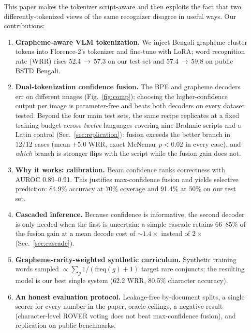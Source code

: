 \documentclass[iicol,pdflatex,sn-mathphys-num]{sn-jnl}
\begin{document}
This paper makes the tokenizer script-aware and then exploits the fact that
two differently-tokenized views of the same recognizer disagree in useful
ways. Our contributions:
\begin{enumerate}
  \item \textbf{Grapheme-aware VLM tokenization.} We inject Bengali
        grapheme-cluster tokens into Florence-2's tokenizer and fine-tune
        with LoRA; word recognition rate (WRR) rises 52.4\,$\to$\,57.3
        on our test set and 57.4\,$\to$\,59.8 on public BSTD Bengali.
  \item \textbf{Dual-tokenization confidence fusion.} The BPE and grapheme
        decoders err on different images (Fig.~\ref{fig:comp}); choosing the
        higher-confidence output per image is parameter-free and beats both
        decoders on every dataset tested. Beyond the four main test sets,
        the same recipe replicates at a fixed training budget across
        \emph{twelve} languages covering nine Brahmic scripts and a Latin
        control (Sec.~\ref{sec:replication}): fusion exceeds the better
        branch in 12/12 cases (mean $+5.0$ WRR, exact McNemar $p<0.02$ in
        every case), and \emph{which} branch is stronger flips with the
        script while the fusion gain does not.
  \item \textbf{Why it works: calibration.} Beam confidence ranks
        correctness with AUROC 0.89--0.91. This justifies max-confidence
        fusion and yields selective prediction: 84.9\% accuracy at 70\%
        coverage and 91.4\% at 50\% on our test set.
  \item \textbf{Cascaded inference.} Because confidence is informative, the
        second decoder is only needed when the first is uncertain: a simple
        cascade retains 66--85\% of the fusion gain at a mean decode cost of
        ${\sim}1.4\times$ instead of $2\times$ (Sec.~\ref{sec:cascade}).
  \item \textbf{Grapheme-rarity-weighted synthetic curriculum.} Synthetic
        training words sampled $\propto\sum_g 1/(\mathrm{freq}(g){+}1)$
        target rare conjuncts; the resulting model is our best single system
        (62.2 WRR, 80.5\% character accuracy).
  \item \textbf{An honest evaluation protocol.} Leakage-free by-document
        splits, a single scorer for every number in the paper, oracle
        ceilings, a negative result (character-level ROVER voting does not
        beat max-confidence fusion), and replication on public benchmarks.
\end{enumerate}
\end{document}
